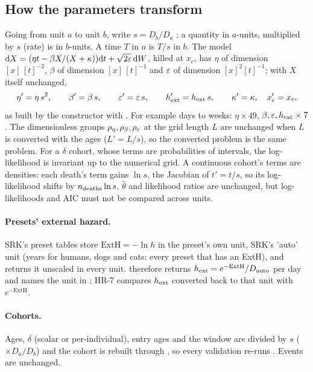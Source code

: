 \subsection{How the parameters transform}\label{sec:units-theta}

Going from unit $a$ to unit $b$, write $s=D_b/D_a$ ; a quantity in $a$-units, multiplied by $s$
(rate) is in $b$-units. A time $T$ in $a$ is $T/s$ in $b$. The model $\mathrm{d} X=(\eta t-\beta X/(X+\kappa))\mathrm{d} t
+\sqrt{2\varepsilon}\,\mathrm{d} W$, killed at $x_c$, has $\eta$ of dimension $[x]\,[t]^{-2}$, $\beta$ of dimension $[x]\,[t]^{-1}$ and $\varepsilon$ of
dimension $[x]^2[t]^{-1}$; with $X$ itself unchanged,
\begin{equation}\label{eq:units-theta}
  \eta'=\eta\,s^{2},\qquad \beta'=\beta\,s,\qquad \varepsilon'=\varepsilon\,s,\qquad h_{\mathrm{ext}}'=h_{\mathrm{ext}}\,s,\qquad \kappa'=\kappa,\quad
  x_c'=x_c ,
\end{equation}
as built by the  constructor with  . For example days to
weeks: $\eta\times49$, $\beta,\varepsilon,h_{\mathrm{ext}}\times7$. The dimensionless groups $\rho_\eta,\rho_\beta,\rho_\varepsilon$ at the grid length
$L$ are unchanged when $L$ is converted with the ages ($L'=L/s$), so the converted problem is the same problem. For a
$\delta$ cohort, whose terms are probabilities of intervals, the log-likelihood is invariant up to the numerical grid.
A continuous cohort's terms are densities: each death's term gains $\ln s$, the Jacobian of $t'=t/s$, so its
log-likelihood shifts by $n_{\rm deaths}\ln s$. $\hat\theta$ and likelihood ratios are unchanged, but log-likelihoods
and AIC must not be compared across units.

\paragraph{Presets' external hazard.} SRK's preset tables store $\mathrm{ExtH}=-\ln h$ in the preset's own unit,
SRK's  'auto' unit (years for humans, dogs and cats: every preset that has an ExtH), and
 returns it unscaled in every unit.  therefore returns
$h_{\mathrm{ext}}=e^{-\mathrm{ExtH}}/D_{\rm auto}$ per day and names the unit in 
; HR-7 compares $h_{\mathrm{ext}}$ converted back to that unit with $e^{-\mathrm{ExtH}}$.

\paragraph{Cohorts.} Ages, $\delta$ (scalar or per-individual), entry ages and the window are divided by $s$
($\times D_a/D_b$) and the cohort is rebuilt through , so every validation re-runs
. Events are unchanged.

